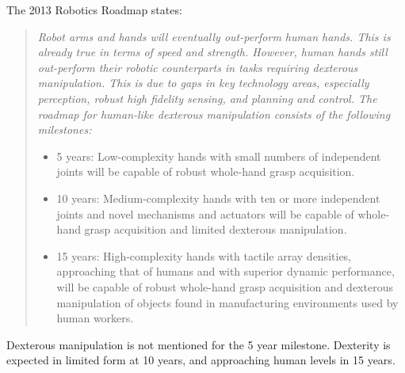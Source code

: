 The 2013 Robotics Roadmap \cite{christensen2009roadmap} states:
\begin{quotation}
{\small \it
Robot arms and hands will eventually out-perform human hands. This is already true in terms of speed and strength. However, human hands still out-perform their robotic counterparts in tasks requiring dexterous manipulation. This is due to gaps in key technology areas, especially perception, robust high fidelity sensing, and planning and control. The roadmap for human-like dexterous manipulation consists of the following milestones:
\begin{itemize}
	\item 5 years: Low-complexity hands with small numbers of independent joints will be capable of robust whole-hand grasp acquisition.
	\item 10 years: Medium-complexity hands with ten or more independent joints and novel mechanisms and actuators will be capable of whole-hand grasp acquisition and limited dexterous manipulation.
	\item 15 years: High-complexity hands with tactile array densities, approaching that of humans and with superior dynamic performance, will be capable of robust whole-hand grasp acquisition and dexterous manipulation of objects found in manufacturing environments used by human workers.
\end{itemize}}
\end{quotation}
Dexterous manipulation is not mentioned for the 5 year milestone.   Dexterity is expected in limited form at 10 years, and approaching human levels in 15 years.

